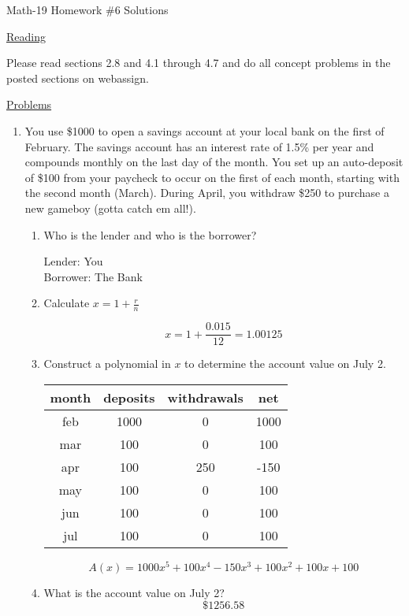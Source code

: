 \documentclass[letterpaper,12pt,fleqn]{article}
\begin{document}
\begin{center}
\Large Math-19 Homework \#6 Solutions
\end{center}

\vspace{0.5in}

\underline{Reading}

Please read sections 2.8 and 4.1 through 4.7 and do all concept problems in the
posted sections on web\-assign.

\underline{Problems}

\begin{enumerate}
\item You use \$1000 to open a savings account at your local bank on the first
of February. The savings account has an interest rate of 1.5\% per year and
compounds monthly on the last day of the month. You set up an auto-deposit of
\$100 from your paycheck to occur on the first of each month, starting with the
second month (March).  During April, you withdraw \$250 to purchase a new
gameboy (gotta catch em all!).
\begin{enumerate}
\item Who is the lender and who is the borrower?

\bigskip

Lender: You \\
Borrower: The Bank

\bigskip

\item Calculate $x=1+\frac{r}{n}$

\[x=1+\frac{0.015}{12}=1.00125\]

\item Construct a polynomial in $x$ to determine the account value on July 2.

\begin{tabular}{|c|c|c|c|}
\hline
month & deposits & withdrawals & net \\
\hline
feb & 1000 & 0 & 1000 \\
mar & 100 & 0 & 100 \\
apr & 100 & 250 & -150 \\
may & 100 & 0 & 100 \\
jun & 100 & 0 & 100 \\
jul & 100 & 0 & 100 \\
\hline
\end{tabular}

\[A(x)=1000x^5+100x^4-150x^3+100x^2+100x+100\]

\item What is the account value on July 2?
\[\$1256.58\]
\end{enumerate}


\end{enumerate}
\end{document}
